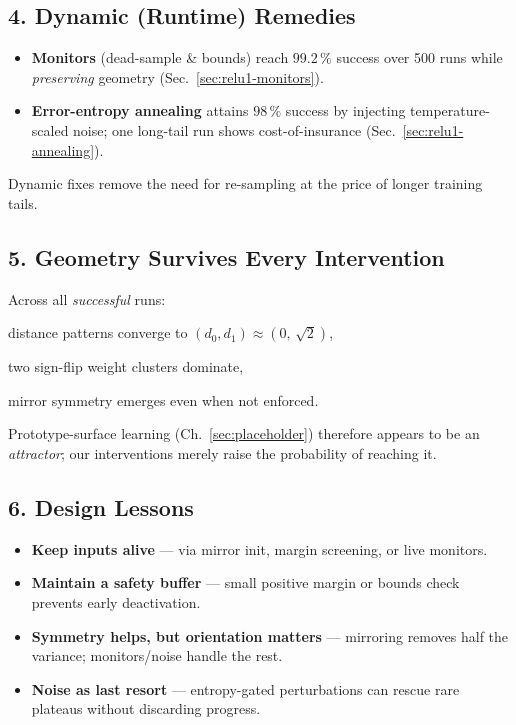 \subsection*{4.  Dynamic (Runtime) Remedies}
\begin{itemize}
  \item \textbf{Monitors} (dead-sample \& bounds) reach $99.2\,\%$
        success over 500 runs while \emph{preserving} geometry
        (Sec.~\ref{sec:relu1-monitors}).
  \item \textbf{Error-entropy annealing} attains $98\,\%$ success by
        injecting temperature-scaled noise; one long-tail run shows
        cost-of-insurance (Sec.~\ref{sec:relu1-annealing}).
\end{itemize}
Dynamic fixes remove the need for re-sampling at the price of longer
training tails.

\subsection*{5.  Geometry Survives Every Intervention}
Across all \emph{successful} runs:
\begin{enumerate*}[label=(\roman*)]
  \item distance patterns converge to $(d_{0},d_{1})\approx(0,\,\sqrt2)$,
  \item two sign-flip weight clusters dominate,
  \item mirror symmetry emerges even when not enforced.
\end{enumerate*}
Prototype-surface learning (Ch.~\ref{sec:placeholder}) therefore
appears to be an \emph{attractor}; our interventions merely raise the
probability of reaching it.

\subsection*{6.  Design Lessons}
\begin{itemize}
  \item \textbf{Keep inputs alive} — via mirror init, margin screening,
        or live monitors.
  \item \textbf{Maintain a safety buffer} — small positive margin or
        bounds check prevents early deactivation.
  \item \textbf{Symmetry helps, but orientation matters} — mirroring
        removes half the variance; monitors/noise handle the rest.
  \item \textbf{Noise as last resort} — entropy-gated perturbations can
        rescue rare plateaus without discarding progress.
\end{itemize}

